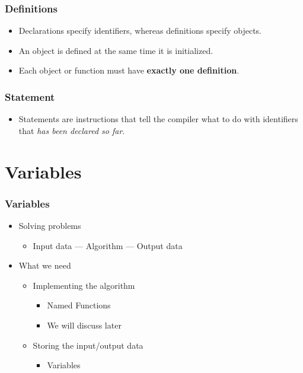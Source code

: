 \documentclass{../c-lecture}
\begin{document}
\begin{frame}
  \frametitle{Definitions}
  \begin{itemize}
    \item Declarations specify identifiers, whereas definitions specify objects.
    \item An object is defined at the same time it is initialized.
    \item Each object or function must have \textbf{\color{Cyan} exactly one definition}.
  \end{itemize}
\end{frame}

\begin{frame}
  \frametitle{Statement}
  \begin{itemize}
    \item Statements are instructions that tell the compiler what to do with identifiers that \textit{\color{Peach} has been declared so far}.
  \end{itemize}
\end{frame}

\section{Variables}

\begin{frame}
  \frametitle{Variables}
  \begin{itemize}
    \item Solving problems
    \begin{itemize}
      \item Input data --- Algorithm --- Output data
    \end{itemize}
    \item What we need
    \begin{itemize}
      \item Implementing the algorithm
      \begin{itemize}
        \item Named {\color{Orange} Functions}
        \item We will discuss later
      \end{itemize}
      \item Storing the input/output data
      \begin{itemize}
        \item {\color{Orange} Variables}
      \end{itemize}
    \end{itemize}
  \end{itemize}
\end{frame}
\end{document}
